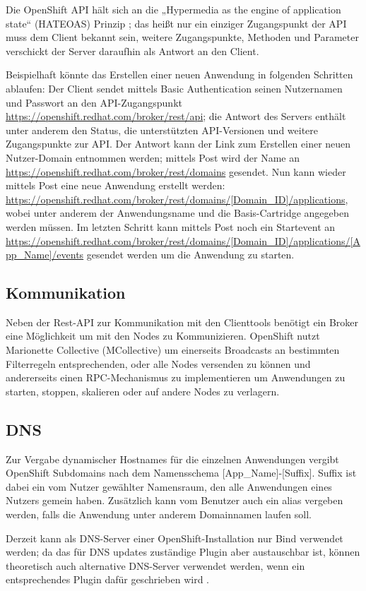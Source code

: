 \documentclass[10pt,a4paper,compsoc]{IEEEtran}
\begin{document}
Die OpenShift API hält sich an die „Hypermedia as the engine of application state“ (HATEOAS) Prinzip \cite{dis_rest}; das heißt nur ein einziger Zugangspunkt der API muss dem Client bekannt sein, weitere Zugangspunkte, Methoden und Parameter verschickt der Server daraufhin als Antwort an den Client.

Beispielhaft könnte das Erstellen einer neuen Anwendung in folgenden Schritten ablaufen:
Der Client sendet mittels Basic Authentication seinen Nutzernamen und Passwort an den API-Zugangspunkt \url{https://openshift.redhat.com/broker/rest/api}; die Antwort des Servers enthält unter anderem den Status, die unterstützten API-Versionen und weitere Zugangspunkte zur API.
Der Antwort kann der Link zum Erstellen einer neuen Nutzer-Domain entnommen werden; mittels Post wird der Name an \url{https://openshift.redhat.com/broker/rest/domains} gesendet.
Nun kann wieder mittels Post eine neue Anwendung erstellt werden: \url{https://openshift.redhat.com/broker/rest/domains/[Domain_ID]/applications}, wobei unter anderem der Anwendungsname und die Basis-Cartridge angegeben werden müssen.
Im letzten Schritt kann mittels Post noch ein Startevent an \url{https://openshift.redhat.com/broker/rest/domains/[Domain_ID]/applications/[App_Name]/events} gesendet werden um die Anwendung zu starten.

\subsection{Kommunikation}
Neben der Rest-API zur Kommunikation mit den Clienttools benötigt ein Broker eine Möglichkeit um mit den Nodes zu Kommunizieren. OpenShift nutzt Marionette Collective (MCollective) um einerseits Broadcasts an bestimmten Filterregeln entsprechenden, oder alle Nodes versenden zu können und andererseits einen RPC-Mechanismus zu implementieren um Anwendungen zu starten, stoppen, skalieren oder auf andere Nodes zu verlagern.

\subsection{DNS}
Zur Vergabe dynamischer Hostnames für die einzelnen Anwendungen vergibt OpenShift Subdomains nach dem Namensschema
[App\_Name]-[Suffix]. Suffix ist dabei ein vom Nutzer gewählter Namensraum, den alle Anwendungen eines Nutzers gemein haben. Zusätzlich kann vom Benutzer auch ein alias vergeben werden, falls die Anwendung unter anderem Domainnamen laufen soll.

Derzeit kann als DNS-Server einer OpenShift-Installation nur Bind verwendet werden; da das für DNS updates zuständige Plugin aber austauschbar ist, können theoretisch auch alternative DNS-Server verwendet werden, wenn ein entsprechendes Plugin dafür geschrieben wird \cite[3.4.2]{os_buildyourown}.
\end{document}
